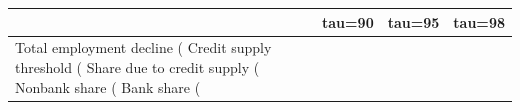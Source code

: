 \begin{tabular}{l*{3}{c}}
\hline\hline
            &      tau=90&      tau=95&      tau=98\\
\hline
Total employment decline (%
Credit supply threshold (%
Share due to credit supply (%
Nonbank share (%
Bank share (%
\hline\hline
\end{tabular}
